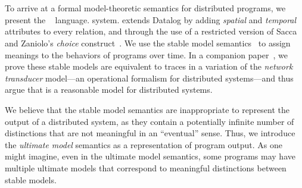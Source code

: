 \section{\large \bf \lang}
\label{sec:foundation}

To arrive at a formal model-theoretic semantics for distributed programs, we present the
\lang~\cite{dedalus} language.
system.  %
\lang extends Datalog by adding {\em spatial} and {\em temporal} attributes to every relation, and through the use of a restricted version of Sacca and Zaniolo's {\em choice} construct~\cite{sacca-zaniolo}.  We use the stable model semantics~\cite{stable-model} to assign meanings to the behaviors of \lang programs over time.  
In a companion paper~\cite{ameloot-operational}, we prove these stable models are equivalent to traces in a variation of the {\em network transducer} model---an operational formalism for distributed systems---and thus argue that \lang is a reasonable model for distributed systems.

We believe that the stable model semantics are inappropriate to represent the output of a distributed system, as they contain a potentially infinite number of distinctions that are not meaningful in an ``eventual'' sense.  Thus, we introduce the {\em ultimate model} semantics as a representation of program output.  As one might imagine, even in the ultimate model semantics, some programs may have multiple ultimate models that correspond to meaningful distinctions between stable models.


